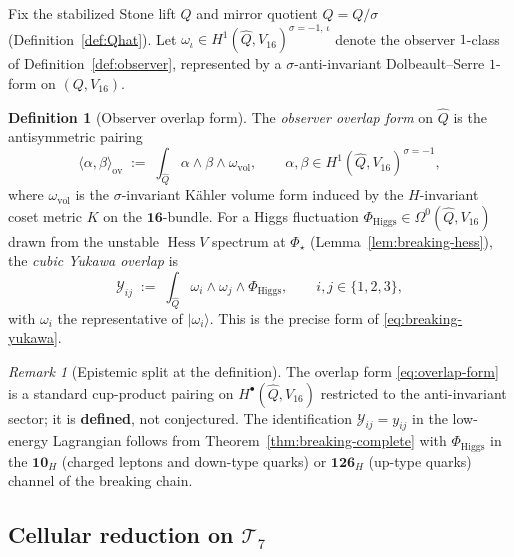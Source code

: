 \documentclass[aps,prd,onecolumn,amsmath,amssymb,nofootinbib,11pt]{revtex4-2}
\numberwithin{equation}{section}
\theoremstyle{plain}
\theoremstyle{definition}
\newtheorem{definition}[theorem]{Definition}
\theoremstyle{remark}
\newtheorem{remark}[theorem]{Remark}
\newcommand{\orderparam}{\Phi}
\newcommand{\Hess}{\operatorname{Hess}}
\begin{document}
Fix the stabilized Stone lift $Q$ and mirror quotient $\hat Q=Q/\sigma$
(Definition~\ref{def:Qhat}). Let $\omega_\iota\in
H^1(\hat Q,V_{16})^{\sigma=-1,\,\iota}$ denote the observer $1$-class of
Definition~\ref{def:observer}, represented by a $\sigma$-anti-invariant
Dolbeault--Serre $1$-form on $(Q,V_{16})$.

\begin{definition}[Observer overlap form]\label{def:overlap-form}
The \emph{observer overlap form} on $\hat Q$ is the antisymmetric pairing
\begin{equation}\label{eq:overlap-form}
  \langle\alpha,\beta\rangle_{\mathrm{ov}}
  \;:=\;
  \int_{\hat Q}\alpha\wedge\beta\wedge\omega_{\mathrm{vol}},
  \qquad
  \alpha,\beta\in H^1(\hat Q,V_{16})^{\sigma=-1},
\end{equation}
where $\omega_{\mathrm{vol}}$ is the $\sigma$-invariant K\"ahler volume form
induced by the $H$-invariant coset metric $K$ on the $\mathbf{16}$-bundle.
For a Higgs fluctuation $\Phi_{\mathrm{Higgs}}\in\Omega^0(\hat Q,V_{16})$
drawn from the unstable $\Hess V$ spectrum at $\orderparam_\star$
(Lemma~\ref{lem:breaking-hess}), the \emph{cubic Yukawa overlap} is
\begin{equation}\label{eq:yukawa-overlap}
  \mathcal{Y}_{ij}
  \;:=\;
  \int_{\hat Q}\omega_i\wedge\omega_j\wedge\Phi_{\mathrm{Higgs}},
  \qquad i,j\in\{1,2,3\},
\end{equation}
with $\omega_i$ the representative of $|\omega_i\rangle$. This is the
precise form of \eqref{eq:breaking-yukawa}.
\end{definition}

\begin{remark}[Epistemic split at the definition]
The overlap form \eqref{eq:overlap-form} is a standard cup-product pairing
on $H^\bullet(\hat Q,V_{16})$ restricted to the anti-invariant sector; it is
\textbf{defined}, not conjectured. The identification
$\mathcal{Y}_{ij}=y_{ij}$ in the low-energy Lagrangian follows from
Theorem~\ref{thm:breaking-complete} with $\Phi_{\mathrm{Higgs}}$ in the
$\mathbf{10}_H$ (charged leptons and down-type quarks) or $\mathbf{126}_H$
(up-type quarks) channel of the breaking chain.
\end{remark}

\subsection{Cellular reduction on $\mathcal{T}_7$}
\label{sec:yukawa:cellular}
\end{document}
